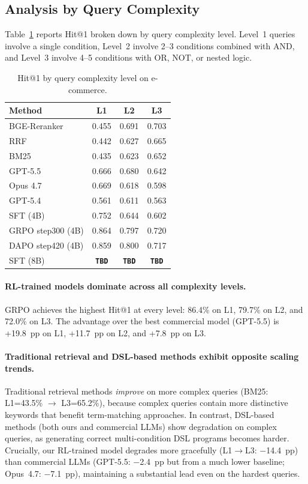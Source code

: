 \documentclass[11pt]{article}
\begin{document}
\subsection{Analysis by Query Complexity}
\label{sec:complexity}

Table~\ref{tab:complexity} reports Hit@1 broken down by query complexity level. Level~1 queries involve a single condition, Level~2 involve 2--3 conditions combined with AND, and Level~3 involve 4--5 conditions with OR, NOT, or nested logic.

\begin{table}[t]
\centering
\small
\caption{Hit@1 by query complexity level on e-commerce.}
\label{tab:complexity}
\begin{tabular}{lccc}
\toprule
\textbf{Method} & \textbf{L1} & \textbf{L2} & \textbf{L3} \\
\midrule
BGE-Reranker & 0.455 & 0.691 & 0.703 \\
RRF & 0.442 & 0.627 & 0.665 \\
BM25 & 0.435 & 0.623 & 0.652 \\
\midrule
GPT-5.5 & 0.666 & 0.680 & 0.642 \\
Opus 4.7 & 0.669 & 0.618 & 0.598 \\
GPT-5.4 & 0.561 & 0.611 & 0.563 \\
\midrule
SFT (4B) & 0.752 & 0.644 & 0.602 \\
GRPO step300 (4B) & 0.864 & 0.797 & 0.720 \\
DAPO step420 (4B) & 0.859 & 0.800 & 0.717 \\
SFT (8B) & \textbf{\texttt{TBD}} & \textbf{\texttt{TBD}} & \textbf{\texttt{TBD}} \\
\bottomrule
\end{tabular}
\end{table}

\paragraph{RL-trained models dominate across all complexity levels.}
GRPO achieves the highest Hit@1 at every level: 86.4\% on L1, 79.7\% on L2, and 72.0\% on L3. The advantage over the best commercial model (GPT-5.5) is +19.8~pp on L1, +11.7~pp on L2, and +7.8~pp on L3.

\paragraph{Traditional retrieval and DSL-based methods exhibit opposite scaling trends.}
Traditional retrieval methods \emph{improve} on more complex queries (BM25: L1=43.5\% $\to$ L3=65.2\%), because complex queries contain more distinctive keywords that benefit term-matching approaches.
In contrast, DSL-based methods (both ours and commercial LLMs) show degradation on complex queries, as generating correct multi-condition DSL programs becomes harder.
Crucially, our RL-trained model degrades more gracefully (L1$\to$L3: $-$14.4~pp) than commercial LLMs (GPT-5.5: $-$2.4~pp but from a much lower baseline; Opus~4.7: $-$7.1~pp), maintaining a substantial lead even on the hardest queries.
\end{document}
